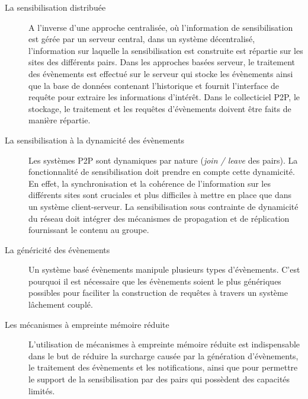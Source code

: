 \begin{description}
	\item[La sensibilisation distribuée] A l'inverse d'une approche centralisée, où 
	l'information de sensibilisation est gérée par un serveur central, dans un 
	système décentralisé, l'information sur laquelle la sensibilisation est construite 
	est répartie sur les sites des différents pairs. Dans les approches basées 
	serveur, le traitement des évènements est effectué sur le serveur qui stocke 
	les évènements ainsi que la base de données contenant l'historique et fournit 
	l'interface de requête pour extraire les informations d'intérêt. Dans le collecticiel 
	\gls{P2P}, le stockage, le traitement et les requêtes d'évènements doivent être 
	faits 
	de manière répartie.
	
	\item[La sensibilisation à la dynamicité des évènements] Les systèmes 
	\gls{P2P} 
	sont dynamiques par nature (\textit{join / leave} des pairs). La fonctionnalité de 
	sensibilisation doit prendre en compte cette dynamicité. En effet, la 
	synchronisation et la cohérence de l'information sur les différents sites sont 
	cruciales et plus difficiles à mettre en place que dans un système 
	client-serveur. La sensibilisation sous contrainte de dynamicité du réseau doit 
	intégrer des mécanismes de propagation et de réplication fournissant le contenu 
	au groupe. 
	
	\item[La généricité des évènements] Un système basé évènements manipule 
	plusieurs types d'évènements. C'est pourquoi il est nécessaire que les 
	évènements soient le plus génériques possibles pour faciliter la construction de 
	requêtes à travers un système lâchement couplé.
	
	\item[Les mécanismes à empreinte mémoire réduite] L'utilisation de 
	mécanismes à empreinte mémoire réduite est indispensable dans le but de 
	réduire la surcharge causée par la génération d'évènements, le traitement des 
	évènements et les notifications, ainsi que pour permettre le support de la 
	sensibilisation par des pairs qui possèdent des capacités limités.
	
\end{description}
%


